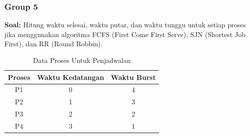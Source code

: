 \documentclass[12pt]{article}
\begin{document}
\subsubsection{Group 5}
\textbf{Soal:}
Hitung waktu selesai, waktu putar, dan waktu tunggu untuk setiap proses jika menggunakan algoritma FCFS (First Come First Serve), SJN (Shortest Job First), dan RR (Round Robbin).
    \begin{table}[h] %
        \centering
        \begin{tabular}{|c|c|c|} %
        \hline
        Proses & Waktu Kedatangan & Waktu Burst \\ %
        \hline
        P1 & 0 & 4 \\ %
        \hline
        P2 & 1 & 3 \\ %
        \hline
        P3 & 2 & 2 \\
        \hline
        P4 & 3 & 1 \\
        \hline
        \end{tabular}
        \caption{Data Proses Untuk Penjadwalan} %
        \label{tab:Data Proses Untuk Penjadwalan} %
    \end{table}
\end{document}
